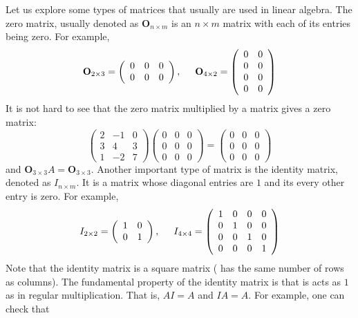 \documentclass{ximera}
\begin{document}
Let us explore some types of matrices that usually are used in linear algebra. The zero matrix, usually denoted as $\textbf{O}_{n\times m}$ is an $n\times m$ matrix with each of its entries being zero. For example,
\[
\textbf{O}_{2\times 3} = \left(\begin{array}{ccc}
0 & 0 &0 \\
0 & 0 & 0
\end{array}\right), \hspace{.5cm} \textbf{O}_{4\times 2} = \left(\begin{array}{cc}
0 & 0 \\
0 & 0 \\
0 & 0\\
0 & 0
\end{array}\right)\]
It is not hard to see that the zero matrix multiplied by a matrix gives a zero matrix:
\[
\left(\begin{array}{ccc}
2 & -1 & 0 \\
3 & 4 & 3\\
1 & -2 & 7
\end{array}\right) \left(\begin{array}{ccc}
0 &0 &0 \\
0 &0 &0 \\
0 &0 &0
\end{array}\right) = \left(\begin{array}{ccc}
0 &0 &0 \\
0 &0 &0 \\
0 &0 &0
\end{array}\right)
\]
and $\textbf{O}_{3\times 3} A = \textbf{O}_{3 \times 3}$. Another important type of matrix is the identity matrix, denoted as $I_{n\times m}$. It is a matrix whose diagonal entries are $1$ and its every other entry is zero. For example,
\[ I_{2\times 2}=
\left(\begin{array}{cc}
1 & 0 \\
0 & 1
\end{array}\right), \hspace{.5cm}  I_{4\times 4} = \left(\begin{array}{cccc}
1 & 0 & 0 & 0 \\
0 & 1 & 0& 0 \\
0& 0 & 1 & 0\\
0 & 0 & 0 & 1
\end{array}\right)
\]
Note that the identity matrix is a square matrix ( has the same number of rows as columns). The fundamental property of the identity matrix is that is acts as $1$ as in regular multiplication. That is, $AI = A$ and $IA= A$. For example, one can check that
\end{document}
